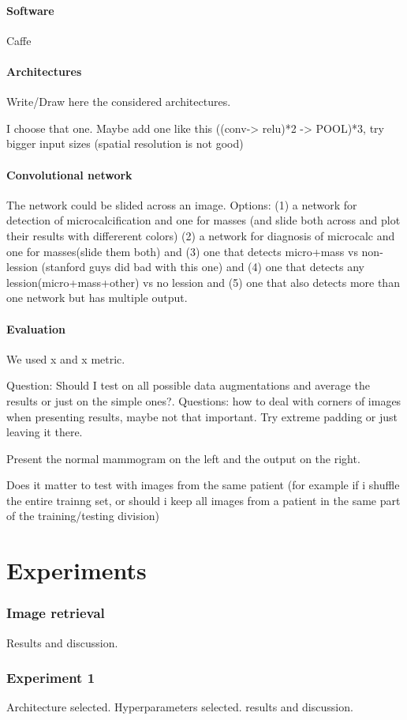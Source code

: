 \documentclass[11pt]{article}
\begin{document}
	\subsection{Software}
	Caffe

	\subsection{Architectures}
	Write/Draw here the considered architectures.

	I choose that one. Maybe add one like this ((conv-> relu)*2 -> POOL)*3, try bigger input sizes (spatial resolution is not good)

	\subsection{Convolutional network}
	The network could be slided across an image. Options: (1) a network for detection of microcalcification and one for masses (and slide both across and plot their results with differerent colors) (2) a network for diagnosis of microcalc and one for masses(slide them both) and (3) one that detects micro+mass vs non-lession (stanford guys did bad with this one) and (4) one that detects any lession(micro+mass+other) vs no lession and (5) one that also detects more than one network but has multiple output.

	\subsection{Evaluation}
We used x and x metric.

	Question: Should I test on all possible data augmentations and average the results or just on the simple ones?.	
	Questions: how to deal with corners of images when presenting results, maybe not that important. Try extreme padding or just leaving it there.

	Present the normal mammogram on the left and the output on the right.

	Does it matter to test with images from the same patient (for example if i shuffle the entire trainng set, or should i keep all images from a patient in the same part of the training/testing division)
	

	\part{Experiments}
	\section{Image retrieval}
	Results and discussion.
	\section{Experiment 1}
	Architecture selected. Hyperparameters selected. results and discussion.

	
	
	
\end{document}
